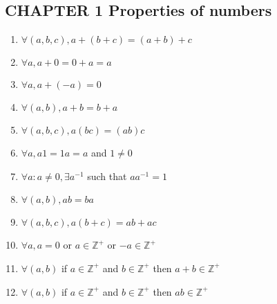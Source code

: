 \documentclass[a4paper, 11pt]{article}
\begin{document}
\subsection*{CHAPTER 1 Properties of numbers}
\begin{enumerate}
  \item $\forall (a, b, c),  a + (b + c) = (a + b) + c$
  \item $\forall a,  a + 0 = 0 + a = a$
  \item $\forall a, a + (-a) = 0$
  \item $\forall (a, b), a + b = b + a$
  \item $\forall (a, b, c), a(bc) = (ab)c$
  \item $\forall a, a1 = 1a = a$ and $1 \ne 0$
  \item $\forall a: a \ne 0, \exists a^{-1}$ such that $aa^{-1} = 1$
  \item $\forall (a, b), ab = ba$
  \item $\forall (a, b, c), a(b + c) = ab + ac$
  \item $\forall a, a = 0$ or $a \in \mathbb{Z}^+$ or $-a \in \mathbb{Z}^+$
  \item $\forall (a, b)$ if $a \in \mathbb{Z}^+$ and $b \in \mathbb{Z}^+$ then $a + b \in \mathbb{Z}^+$
  \item $\forall (a, b)$ if $a \in \mathbb{Z}^+$ and $b \in \mathbb{Z}^+$ then $ab \in \mathbb{Z}^+$
\end{enumerate}
\end{document}
